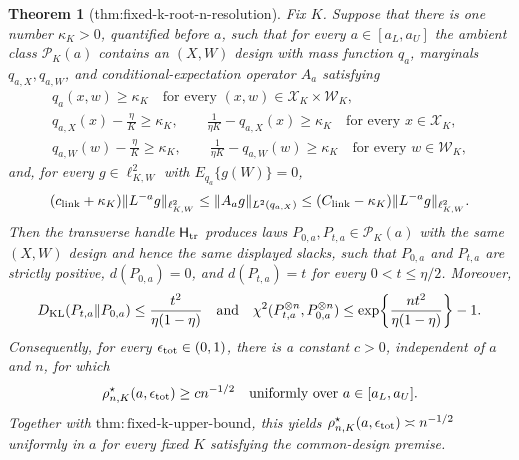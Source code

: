 \documentclass{article}
\newtheorem{theorem}{Theorem}
\begin{document}
\begin{theorem}[thm:fixed-k-root-n-resolution]\label{thm:fixed-k-root-n-resolution}
Fix \(K\).  Suppose that there is one number \(\kappa_K>0\), quantified before \(a\), such that for every \(a\in[a_L,a_U]\) the ambient class \(\mathcal P_K(a)\) contains an \((X,W)\) design with mass function \(q_a\), marginals \(q_{a,X},q_{a,W}\), and conditional-expectation operator \(A_a\) satisfying
\[
\begin{gathered}
q_a(x,w)\ge \kappa_K\quad\text{for every }(x,w)\in\mathcal X_K\times\mathcal W_K,\\
q_{a,X}(x)-\frac{\eta}{K}\ge\kappa_K,
\qquad \frac{1}{\eta K}-q_{a,X}(x)\ge\kappa_K
\quad\text{for every }x\in\mathcal X_K,\\
q_{a,W}(w)-\frac{\eta}{K}\ge\kappa_K,
\qquad \frac{1}{\eta K}-q_{a,W}(w)\ge\kappa_K
\quad\text{for every }w\in\mathcal W_K,
\end{gathered}
\]
and, for every \(g\in\ell^2_{K,W}\) with \(E_{q_a}\{g(W)\}=0\),
\[
(c_{\rm link}+\kappa_K)\|L^{-a}g\|_{\ell^2_{K,W}}
\le \|A_ag\|_{L^2(q_{a,X})}
\le (C_{\rm link}-\kappa_K)\|L^{-a}g\|_{\ell^2_{K,W}}.
\]
Then the transverse handle \(\mathsf H_{\rm tr}\) produces laws \(P_{0,a},P_{t,a}\in\mathcal P_K(a)\) with the same \((X,W)\) design and hence the same displayed slacks, such that \(P_{0,a}\) and \(P_{t,a}\) are strictly positive, \(d(P_{0,a})=0\), and \(d(P_{t,a})=t\) for every \(0<t\le\eta/2\).  Moreover,
\[
D_{\rm KL}(P_{t,a}\|P_{0,a})\le\frac{t^2}{\eta(1-\eta)}
\quad\text{and}\quad
\chi^2(P_{t,a}^{\otimes n},P_{0,a}^{\otimes n})
\le \exp\!\left\{\frac{nt^2}{\eta(1-\eta)}\right\}-1.
\]
Consequently, for every \(\epsilon_{\rm tot}\in(0,1)\), there is a constant \(c>0\), independent of \(a\) and \(n\), for which
\[
\rho^\star_{n,K}(a,\epsilon_{\rm tot})\ge c n^{-1/2}
\quad\text{uniformly over }a\in[a_L,a_U].
\]
Together with \(\mathrm{thm:fixed\mbox{-}k\mbox{-}upper\mbox{-}bound}\), this yields \(\rho^\star_{n,K}(a,\epsilon_{\rm tot})\asymp n^{-1/2}\) uniformly in \(a\) for every fixed \(K\) satisfying the common-design premise.
\end{theorem}
\end{document}

